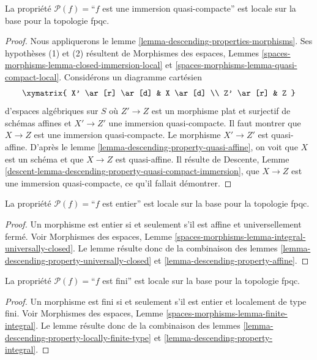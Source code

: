 \begin{lemma}
\label{lemma-descending-property-quasi-compact-immersion}
La propriété $\mathcal{P}(f) =$``$f$ est une immersion quasi-compacte''
est locale sur la base pour la topologie fpqc.
\end{lemma}

\begin{proof}
Nous appliquerons le
lemme \ref{lemma-descending-properties-morphisms}.
Ses hypothèses (1) et (2) résultent de
Morphismes des espaces,
Lemmes \ref{spaces-morphisms-lemma-closed-immersion-local} et
\ref{spaces-morphisms-lemma-quasi-compact-local}.
Considérons un diagramme cartésien
$$
\xymatrix{
X' \ar[r] \ar[d] & X \ar[d] \\
Z' \ar[r] & Z
}
$$
d'espaces algébriques sur $S$
où $Z' \to Z$ est un morphisme plat et surjectif de schémas affines
et $X' \to Z'$ une immersion quasi-compacte. Il faut montrer que $X \to Z$
est une immersion quasi-compacte. Le morphisme $X' \to Z'$ est quasi-affine. D'après le
lemme \ref{lemma-descending-property-quasi-affine},
on voit que $X$ est un schéma et que $X \to Z$ est quasi-affine.
Il résulte de
Descente, Lemme \ref{descent-lemma-descending-property-quasi-compact-immersion},
que $X \to Z$ est une immersion quasi-compacte, ce qu'il fallait démontrer.
\end{proof}

\begin{lemma}
\label{lemma-descending-property-integral}
La propriété $\mathcal{P}(f) =$``$f$ est entier''
est locale sur la base pour la topologie fpqc.
\end{lemma}

\begin{proof}
Un morphisme est entier si et seulement s'il est affine et
universellement fermé. Voir
Morphismes des espaces,
Lemme \ref{spaces-morphisms-lemma-integral-universally-closed}.
Le lemme résulte donc de la combinaison des
lemmes \ref{lemma-descending-property-universally-closed}
et \ref{lemma-descending-property-affine}.
\end{proof}

\begin{lemma}
\label{lemma-descending-property-finite}
La propriété $\mathcal{P}(f) =$``$f$ est fini''
est locale sur la base pour la topologie fpqc.
\end{lemma}

\begin{proof}
Un morphisme est fini si et seulement s'il est entier
et localement de type fini. Voir
Morphismes des espaces, Lemme \ref{spaces-morphisms-lemma-finite-integral}.
Le lemme résulte donc de la combinaison des
lemmes \ref{lemma-descending-property-locally-finite-type}
et \ref{lemma-descending-property-integral}.
\end{proof}


